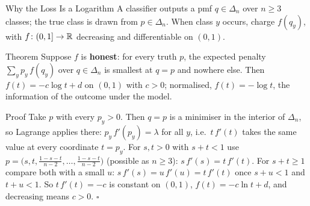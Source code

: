 \begin{frame}{Why the Loss Is a Logarithm}
  \small
  A classifier outputs a pmf $q\in\Delta_n$ over $n\ge3$ classes; the true class is drawn from $p\in\Delta_n$. When class $y$ occurs, charge $f(q_y)$, with $f\colon(0,1]\to\mathbb{R}$ decreasing and differentiable on $(0,1)$.
  \begin{block}{Theorem}
    Suppose $f$ is \textbf{honest}: for every truth $p$, the expected penalty $\sum_yp_y\,f(q_y)$ over $q\in\Delta_n$ is smallest at $q=p$ and nowhere else.
    Then $f(t)=-c\log t+d$ on $(0,1)$ with $c>0$; normalised, $f(t)=-\log t$, the information of the outcome under the model.
  \end{block}
  \begin{block}{Proof}
    Take $p$ with every $p_y>0$. Then $q=p$ is a minimiser in the interior of $\Delta_n$, so Lagrange applies there: $p_y\,f'(p_y)=\lambda$ for all $y$, i.e.\ $t\,f'(t)$ takes the same value at every coordinate $t=p_y$.
    For $s,t>0$ with $s+t<1$ use $p=\big(s,t,\tfrac{1-s-t}{n-2},\dots,\tfrac{1-s-t}{n-2}\big)$ (possible as $n\ge3$): $s\,f'(s)=t\,f'(t)$. For $s+t\ge1$ compare both with a small $u$: $s\,f'(s)=u\,f'(u)=t\,f'(t)$ once $s+u<1$ and $t+u<1$.
    So $t\,f'(t)=-c$ is constant on $(0,1)$, $f(t)=-c\ln t+d$, and decreasing means $c>0$. \hfill$\square$
  \end{block}
\end{frame}

